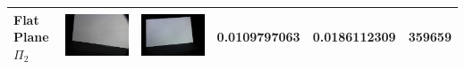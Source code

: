\documentclass[final,12pt,3p]{elsarticle}
\begin{document}
\begin{table}[!ht]
{\begin{tabular}{| l | >{\centering\arraybackslash} m{2.5cm} | >{\centering\arraybackslash} m{2.5cm} | c | c | c |}
   Flat Plane $\Pi_{2}$ & \includegraphics[scale=0.05]{./images/plane2_cam1.JPG} & \includegraphics[scale=0.05]{./images/plane2_cam2.JPG} & 0.0109797063 & 0.0186112309 & 359659\\
   \hline

\end{tabular}}
\end{table}
\end{document}
